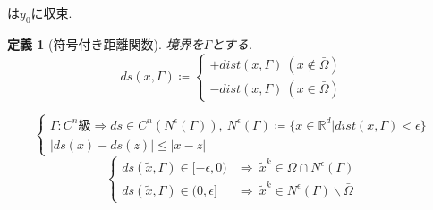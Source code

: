 \documentclass[a4,12pt]{article}
\newtheorem{dfn}{定義}
\begin{document}
は$y_0$に収束.\\
\begin{dfn}[符号付き距離関数]
境界を$\Gamma$とする.\[
ds(x,\Gamma)\coloneqq
\begin{cases}
+dist(x,\Gamma)\ (x\notin\bar{\Omega})\\
-dist(x,\Gamma)\ (x\in\bar{\Omega})
\end{cases}
\]\end{dfn}
\begin{equation}
    \begin{cases}
    \Gamma : C^n\text{級}\Rightarrow ds\in C^n(N^{\epsilon}(\Gamma)),\ N^\epsilon(\Gamma)\coloneqq \{x\in\mathbb{R}^d|dist(x,\Gamma)<\epsilon\}\\
    |ds(x)-ds(z)|\leq|x-z|
    \end{cases}
\end{equation}
\begin{equation}\begin{cases}
ds(\tilde{x},\Gamma)\in[-\epsilon,0)&\Rightarrow\ \tilde{x}^k\in\Omega\cap N^\epsilon(\Gamma)\\
ds(\tilde{x},\Gamma)\in(0,\epsilon]&\Rightarrow\ \tilde{x}^k\in N^\epsilon(\Gamma)\backslash \bar{\Omega}
\end{cases}\end{equation}
\end{document}
